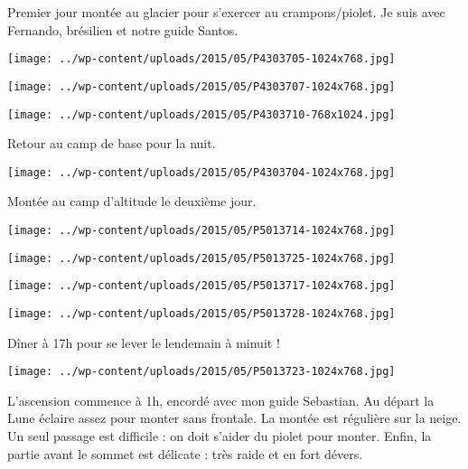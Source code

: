 Premier jour montée au glacier pour s'exercer au crampons/piolet. Je suis avec Fernando, brésilien et notre guide Santos. 
\begin{center} \texttt{[image: ../wp-content/uploads/2015/05/P4303705-1024x768.jpg]} \end{center}
\begin{center} \texttt{[image: ../wp-content/uploads/2015/05/P4303707-1024x768.jpg]} \end{center}

\begin{center} \texttt{[image: ../wp-content/uploads/2015/05/P4303710-768x1024.jpg]} \end{center}

Retour au camp de base pour la nuit. 
\begin{center} \texttt{[image: ../wp-content/uploads/2015/05/P4303704-1024x768.jpg]} \end{center}
\pagebreak

Montée au camp d'altitude le deuxième jour. 
\begin{center} \texttt{[image: ../wp-content/uploads/2015/05/P5013714-1024x768.jpg]} \end{center}
\begin{center} \texttt{[image: ../wp-content/uploads/2015/05/P5013725-1024x768.jpg]} \end{center}

\begin{center} \texttt{[image: ../wp-content/uploads/2015/05/P5013717-1024x768.jpg]} \end{center}
\begin{center} \texttt{[image: ../wp-content/uploads/2015/05/P5013728-1024x768.jpg]} \end{center}
\pagebreak

Dîner à 17h pour se lever le lendemain à minuit ! 
\begin{center} \texttt{[image: ../wp-content/uploads/2015/05/P5013723-1024x768.jpg]} \end{center}

L'ascension commence à 1h, encordé avec mon guide Sebastian. Au départ la Lune éclaire assez pour monter sans frontale. La montée est régulière sur la neige. Un seul passage est difficile : on doit s'aider du piolet pour monter. Enfin, la partie avant le sommet est délicate : très raide et en fort dévers. 


